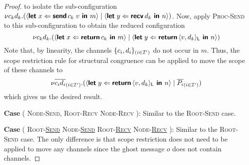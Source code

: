 \begin{proof}
  to isolate the sub-configuration 
  ${\nu{c_k d_k}.{({\langle{\textbf{\textsf{let}}\;{x}\Leftarrow{{\textbf{\textsf{send}}\,{c_k}}\;{v}}\textbf{\textsf{ in }}{m}}\rangle} \mid {\langle{\textbf{\textsf{let}}\;{y}\Leftarrow{\textbf{\textsf{recv}}\,{d_k}}\textbf{\textsf{ in }}{n}}\rangle})}}$.
  Now, apply \textsc{Proc-Send} to this sub-configuration to obtain the reduced configuration
  $$
    {\nu{c_k d_k}.{(
      {\langle{\textbf{\textsf{let}}\;{x}\Leftarrow{\textbf{\textsf{return}}\,{c_k}}\textbf{\textsf{ in }}{m}}\rangle} 
      \mid {\langle{\textbf{\textsf{let}}\;{y}\Leftarrow{\textbf{\textsf{return}}\,{\langle{{v},{d_k}}\rangle_{\textsf{L}}}}\textbf{\textsf{ in }}{n}}\rangle}
    )}}
  $$
  Note that, by linearity, the channels $\{ c_i, d_i \}_{(i \in \mathcal{I}')}$ do not occur in $m$.
  Thus, the scope restriction rule for structural congruence can be applied to move
  the scope of these channels to
  $${\nu{\overline{c_i d_i}_{(i \in \mathcal{I}')}}.{
    ({\langle{\textbf{\textsf{let}}\;{y}\Leftarrow{\textbf{\textsf{return}}\,{\langle{{v},{d_k}}\rangle_{\textsf{L}}}}\textbf{\textsf{ in }}{n}}\rangle} \mid \overline{P_i}_{(i \in \mathcal{I}')})}}$$
  which gives us the desired result.

\noindent
\textbf{Case} (
  \textsc{Node-Send}, 
  \textsc{Root-Recv}
  \textsc{Node-Recv}
): Similar to the \textsc{Root-Send} case.

\noindent
\textbf{Case} (
  \textsc{Root-\underline{Send}}
  \textsc{Node-\underline{Send}}
  \textsc{Root-\underline{Recv}}
  \textsc{Node-\underline{Recv}}
): Similar to the \textsc{Root-Send} case.
The only difference is that scope restriction does not need to be applied
to move any channels since the ghost message $o$ does not contain channels.

\end{proof}
